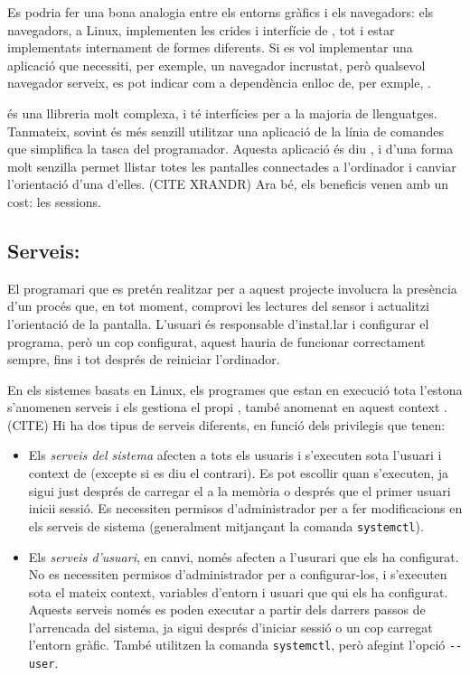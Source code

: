Es podria fer una bona analogia entre
els entorns gràfics i els navegadors: els navegadors, a Linux, implementen les
crides i interfície de , tot i estar implementats internament
de formes diferents. Si es vol implementar una aplicació que necessiti, per
exemple, un navegador incrustat, però qualsevol navegador serveix, es pot
indicar com a dependència  enlloc de, per exmple, .

 és una llibreria molt complexa, i té interfícies per a la majoria
de llenguatges. Tanmateix, sovint és més senzill utilitzar una aplicació de
la línia de comandes que simplifica la tasca del programador. Aquesta
aplicació és diu , i d'una forma molt senzilla permet llistar
totes les pantalles connectades a l'ordinador i canviar l'orientació
d'una d'elles. (CITE XRANDR) Ara bé, els beneficis venen amb un cost: les sessions.

\subsection{Serveis: }
\label{subsec:systemd}

El programari que es pretén realitzar per a aquest projecte involucra la
presència d'un procés que, en tot moment, comprovi les lectures del sensor i
actualitzi l'orientació de la pantalla. L'usuari és responsable d'insta\l.lar i
configurar el programa, però un cop configurat, aquest hauria de funcionar
correctament sempre, fins i tot després de reiniciar l'ordinador.

En els sistemes basats en Linux, els programes que estan en execució tota
l'estona s'anomenen serveis i els gestiona el propi , també anomenat
en aquest context . (CITE) Hi ha dos tipus de serveis diferents, en
funció dels privilegis que tenen:

\begin{itemize}
    \item Els \textit{serveis del sistema} afecten a tots els usuaris i
    s'executen sota l'usuari i context de  (excepte si es diu
    el contrari). Es pot escollir quan s'executen, ja sigui just després de
    carregar el  a la memòria o després que el primer usuari
    inicii sessió. Es necessiten permisos d'administrador per a fer modificacions
    en els serveis de sistema (generalment mitjançant la comanda
    \verb|systemctl|).
    \item Els \textit{serveis d'usuari}, en canvi, només afecten a l'usurari
    que els ha configurat. No es necessiten permisos d'administrador per a
    configurar-los, i s'executen sota el mateix context, variables d'entorn i
    usuari que qui els ha configurat. Aquests serveis només es poden executar a
    partir dels darrers passos de l'arrencada del sistema, ja sigui després
    d'iniciar sessió o un cop carregat l'entorn gràfic. També utilitzen la
    comanda \verb|systemctl|, però afegint l'opció \verb|--user|.
\end{itemize}

